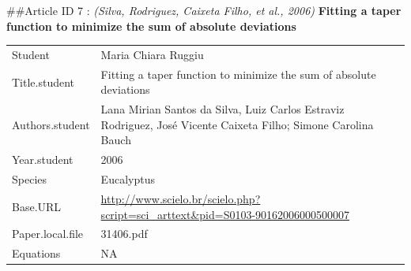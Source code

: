 \documentclass[]{article}
\begin{document}
\#\#Article ID 7 : \emph{(Silva, Rodriguez, Caixeta Filho, et al.,
2006)} \textbf{Fitting a taper function to minimize the sum of absolute
deviations}

\begin{longtable}[]{@{}ll@{}}
\toprule
\endhead
\begin{minipage}[t]{0.21\columnwidth}\raggedright
Student\strut
\end{minipage} & \begin{minipage}[t]{0.73\columnwidth}\raggedright
Maria Chiara Ruggiu\strut
\end{minipage}\tabularnewline
\begin{minipage}[t]{0.21\columnwidth}\raggedright
Title.student\strut
\end{minipage} & \begin{minipage}[t]{0.73\columnwidth}\raggedright
Fitting a taper function to minimize the sum of absolute
deviations\strut
\end{minipage}\tabularnewline
\begin{minipage}[t]{0.21\columnwidth}\raggedright
Authors.student\strut
\end{minipage} & \begin{minipage}[t]{0.73\columnwidth}\raggedright
Lana Mirian Santos da Silva, Luiz Carlos Estraviz Rodriguez, José
Vicente Caixeta Filho; Simone Carolina Bauch\strut
\end{minipage}\tabularnewline
\begin{minipage}[t]{0.21\columnwidth}\raggedright
Year.student\strut
\end{minipage} & \begin{minipage}[t]{0.73\columnwidth}\raggedright
2006\strut
\end{minipage}\tabularnewline
\begin{minipage}[t]{0.21\columnwidth}\raggedright
Species\strut
\end{minipage} & \begin{minipage}[t]{0.73\columnwidth}\raggedright
Eucalyptus\strut
\end{minipage}\tabularnewline
\begin{minipage}[t]{0.21\columnwidth}\raggedright
Base.URL\strut
\end{minipage} & \begin{minipage}[t]{0.73\columnwidth}\raggedright
\url{http://www.scielo.br/scielo.php?script=sci_arttext\&pid=S0103-90162006000500007}\strut
\end{minipage}\tabularnewline
\begin{minipage}[t]{0.21\columnwidth}\raggedright
Paper.local.file\strut
\end{minipage} & \begin{minipage}[t]{0.73\columnwidth}\raggedright
31406.pdf\strut
\end{minipage}\tabularnewline
\begin{minipage}[t]{0.21\columnwidth}\raggedright
Equations\strut
\end{minipage} & \begin{minipage}[t]{0.73\columnwidth}\raggedright
NA\strut
\end{minipage}\tabularnewline
\bottomrule
\end{longtable}
\end{document}
